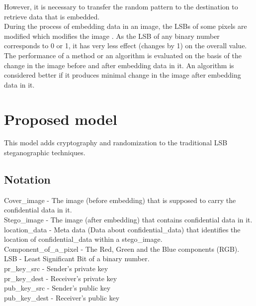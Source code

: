 \documentclass[conference]{IEEEtran}
\begin{document}
However, it is necessary to transfer the random pattern to the destination to retrieve data that is embedded. \\

During the process of embedding data in an image, the LSBs of some pixels are modified which modifies the image \cite{b1}.
As the LSB of any binary number corresponds to 0 or 1, it has very less effect (changes by 1) on the overall value.\\ 

The performance of a method or an algorithm is evaluated on the basis of the change in the image before and after embedding data in it.
An algorithm is considered better if it produces minimal change in the image after embedding data in it.\\

\section{Proposed model}
This model adds cryptography and randomization to the traditional LSB steganographic techniques.

\subsection{Notation}
Cover\_image - The image (before embedding) that is supposed to carry the confidential data in it. \\

Stego\_image - The image (after embedding) that contains confidential data in it. \\

location\_data - Meta data (Data about confidential\_data) that identifies the location of confidential\_data within a stego\_image. \\

Component\_of\_a\_pixel - The Red, Green and the Blue components (RGB). \\

LSB - Least Significant Bit of a binary number. \\

pr\_key\_src - Sender's private key \\

pr\_key\_dest - Receiver's private key \\

pub\_key\_src - Sender's public key \\

pub\_key\_dest - Receiver's public key \\
\end{document}

